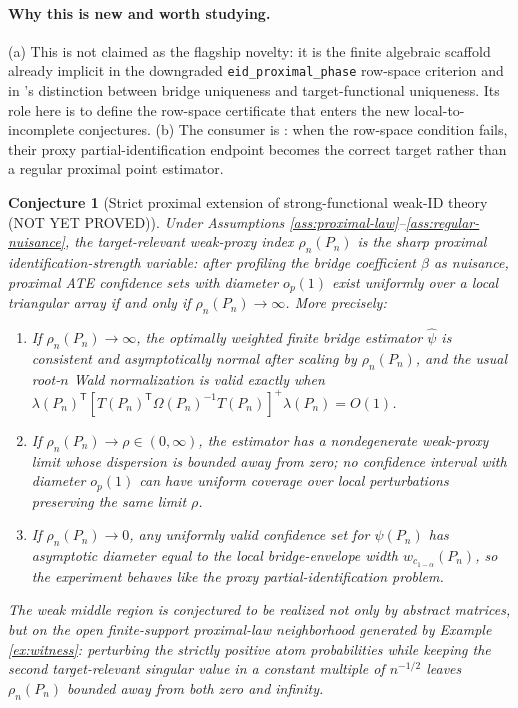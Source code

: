 \documentclass[11pt]{article}
\newcommand{\transpose}{\mathsf{T}}
\theoremstyle{definition}
\theoremstyle{plain}
\newtheorem{conjecture}{Conjecture}
\theoremstyle{remark}
\begin{document}
\paragraph{Why this is new and worth studying.}
(a) This is not claimed as the flagship novelty: it is the finite algebraic
scaffold already implicit in the downgraded \texttt{eid\_proximal\_phase}
row-space criterion and in \cite[Section 2]{ZhangLiMiaoTchetgen2023}'s
distinction between bridge uniqueness and target-functional uniqueness.  Its
role here is to define the row-space certificate that enters the new
local-to-incomplete conjectures.  (b) The consumer is
\cite{GhassamiShpitserTchetgen2023}: when the row-space condition fails, their
proxy partial-identification endpoint becomes the correct target rather than a
regular proximal point estimator.

\begin{conjecture}[Strict proximal extension of strong-functional weak-ID theory (NOT YET PROVED)]\label{conj:phase}
Under Assumptions \ref{ass:proximal-law}--\ref{ass:regular-nuisance}, the
target-relevant weak-proxy index $\rho_n(P_n)$ is the sharp proximal
identification-strength variable: after profiling the bridge coefficient
$\beta$ as nuisance, proximal ATE confidence sets with diameter $o_p(1)$ exist
uniformly over a local triangular array if and only if
$\rho_n(P_n)\to\infty$.  More precisely:
\begin{enumerate}[label=(\roman*)]
\item If $\rho_n(P_n)\to\infty$, the optimally weighted finite bridge
estimator $\widehat\psi$ is consistent and asymptotically normal after scaling by
$\rho_n(P_n)$, and the usual root-$n$ Wald normalization is valid exactly when
$\lambda(P_n)^\transpose[T(P_n)^\transpose\Omega(P_n)^{-1}T(P_n)]^+
\lambda(P_n)=O(1)$.
\item If $\rho_n(P_n)\to\rho\in(0,\infty)$, the estimator has a nondegenerate
weak-proxy limit whose dispersion is bounded away from zero; no confidence
interval with diameter $o_p(1)$ can have uniform coverage over local
perturbations preserving the same limit $\rho$.
\item If $\rho_n(P_n)\to0$, any uniformly valid confidence set for
$\psi(P_n)$ has asymptotic diameter equal to the local bridge-envelope width
$w_{c_{1-\alpha}}(P_n)$, so the experiment behaves like the proxy
partial-identification problem.
\end{enumerate}
The weak middle region is conjectured to be realized not only by abstract
matrices, but on the open finite-support proximal-law neighborhood generated
by Example \ref{ex:witness}: perturbing the strictly positive atom
probabilities while keeping the second target-relevant singular value in a
constant multiple of $n^{-1/2}$ leaves $\rho_n(P_n)$ bounded away from both
zero and infinity.
\end{conjecture}
\end{document}
